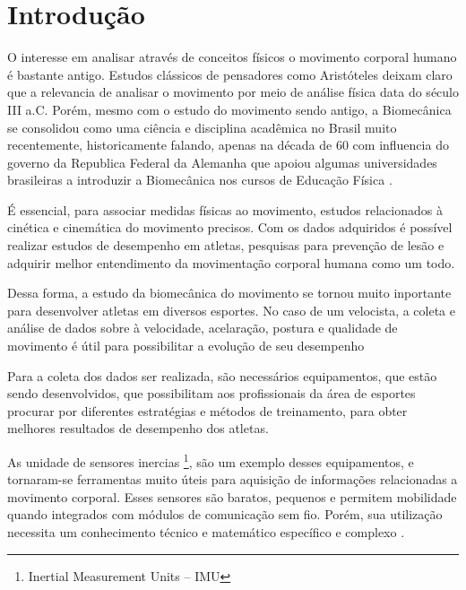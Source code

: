 
\chapter[Introdução]{Introdução}

O interesse em analisar através de conceitos físicos o movimento corporal humano é bastante antigo. Estudos clássicos de pensadores como Aristóteles deixam claro que a relevancia de analisar o movimento por meio de análise física data do século III a.C. Porém, mesmo com o estudo do movimento sendo antigo, a Biomecânica se consolidou como uma ciência e disciplina acadêmica no Brasil muito recentemente, historicamente falando, apenas na década de 60 com influencia do governo da Republica Federal da Alemanha que apoiou algumas universidades brasileiras a introduzir a Biomecânica nos cursos de Educação Física \cite{Acquesta2008}.

É essencial, para associar medidas físicas ao movimento,  estudos relacionados à cinética e cinemática do movimento precisos. Com os dados adquiridos é possível realizar estudos de desempenho em atletas, pesquisas para prevenção de lesão e adquirir melhor entendimento da movimentação corporal humana como um todo\cite{mcginnis2013}.

Dessa forma, a estudo da biomecânica do movimento se tornou muito inportante para desenvolver atletas em diversos esportes. No caso de um velocista, a coleta e análise de dados sobre à velocidade, acelaração, postura e qualidade de movimento é útil para possibilitar a evolução de seu desempenho\cite{okazaki2012}

Para a coleta dos dados ser realizada, são necessários equipamentos, que estão sendo desenvolvidos, que possibilitam aos profissionais da área de esportes procurar por diferentes estratégias e métodos de treinamento, para obter melhores resultados de desempenho dos atletas\cite{okazaki2012}.

As unidade de sensores inercias \footnote{Inertial Measurement Units – IMU}, são um exemplo desses equipamentos, e tornaram-se ferramentas muito úteis para aquisição de informações relacionadas a movimento corporal. Esses sensores são baratos, pequenos e permitem mobilidade quando integrados com módulos de comunicação sem fio. Porém, sua utilização necessita um conhecimento técnico e matemático específico e complexo \cite{ober2015}.

